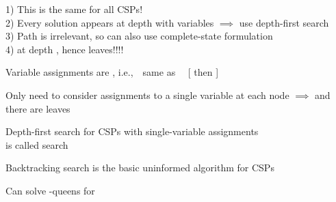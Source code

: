 \documentclass{article}
\begin{document}
\begin{huge}
\vspace*{0.3in}

1) This is the same for all CSPs! \smiley\\
2) Every solution appears at depth  with  variables\nl
   $\implies$ use depth-first search\\
3) Path is irrelevant, so can also use complete-state formulation\\
4)  at depth \mat{$\ell$}, hence  leaves!!!! \frowny




Variable assignments are , i.e.,\ \ same as \ \ [ then ]

Only need to consider assignments to a single variable at each node\nl
   $\implies$  and there are  leaves\nl

Depth-first search for CSPs with single-variable assignments\\
is called  search

Backtracking search is the basic uninformed algorithm for CSPs

Can solve -queens for 






\maxfigwidth
{}


\maxfigwidth
{}


\maxfigwidth
{}



\end{huge}
\end{document}
